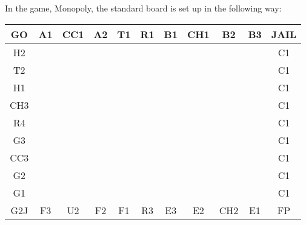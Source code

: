 In the game, Monopoly, the standard board is set up in the following way:
\begin{center}
    \begin{tabular}{|c|c|c|c|c|c|c|c|c|c|c|}
        \hline
        GO & A1 & CC1 & A2 & T1 & R1 & B1 & CH1 & B2 & B3 & JAIL\\
        \hline
        H2 & \cellcolor{lightgrey} & \cellcolor{lightgrey} & \cellcolor{lightgrey} & \cellcolor{lightgrey} & \cellcolor{lightgrey} & \cellcolor{lightgrey} & \cellcolor{lightgrey} & \cellcolor{lightgrey} & \cellcolor{lightgrey} & C1\\
        \hline
        T2 & \cellcolor{lightgrey} & \cellcolor{lightgrey} & \cellcolor{lightgrey} & \cellcolor{lightgrey} & \cellcolor{lightgrey} & \cellcolor{lightgrey} & \cellcolor{lightgrey} & \cellcolor{lightgrey} & \cellcolor{lightgrey} & C1\\
        \hline
        H1 & \cellcolor{lightgrey} & \cellcolor{lightgrey} & \cellcolor{lightgrey} & \cellcolor{lightgrey} & \cellcolor{lightgrey} & \cellcolor{lightgrey} & \cellcolor{lightgrey} & \cellcolor{lightgrey} & \cellcolor{lightgrey} & C1\\
        \hline
        CH3 & \cellcolor{lightgrey} & \cellcolor{lightgrey} & \cellcolor{lightgrey} & \cellcolor{lightgrey} & \cellcolor{lightgrey} & \cellcolor{lightgrey} & \cellcolor{lightgrey} & \cellcolor{lightgrey} & \cellcolor{lightgrey} & C1\\
        \hline
        R4 & \cellcolor{lightgrey} & \cellcolor{lightgrey} & \cellcolor{lightgrey} & \cellcolor{lightgrey} & \cellcolor{lightgrey} & \cellcolor{lightgrey} & \cellcolor{lightgrey} & \cellcolor{lightgrey} & \cellcolor{lightgrey} & C1\\
        \hline
        G3 & \cellcolor{lightgrey} & \cellcolor{lightgrey} & \cellcolor{lightgrey} & \cellcolor{lightgrey} & \cellcolor{lightgrey} & \cellcolor{lightgrey} & \cellcolor{lightgrey} & \cellcolor{lightgrey} & \cellcolor{lightgrey} & C1\\
        \hline
        CC3 & \cellcolor{lightgrey} & \cellcolor{lightgrey} & \cellcolor{lightgrey} & \cellcolor{lightgrey} & \cellcolor{lightgrey} & \cellcolor{lightgrey} & \cellcolor{lightgrey} & \cellcolor{lightgrey} & \cellcolor{lightgrey} & C1\\
        \hline
        G2 & \cellcolor{lightgrey} & \cellcolor{lightgrey} & \cellcolor{lightgrey} & \cellcolor{lightgrey} & \cellcolor{lightgrey} & \cellcolor{lightgrey} & \cellcolor{lightgrey} & \cellcolor{lightgrey} & \cellcolor{lightgrey} & C1\\
        \hline
        G1 & \cellcolor{lightgrey} & \cellcolor{lightgrey} & \cellcolor{lightgrey} & \cellcolor{lightgrey} & \cellcolor{lightgrey} & \cellcolor{lightgrey} & \cellcolor{lightgrey} & \cellcolor{lightgrey} & \cellcolor{lightgrey} & C1\\
        \hline
        G2J & F3 & U2 & F2 & F1 & R3 & E3 & E2 & CH2 & E1 & FP\\
        \hline
    \end{tabular}
\end{center}

